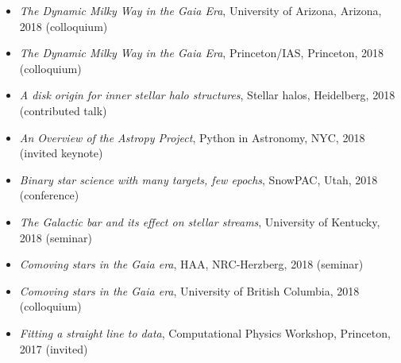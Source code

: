 \documentclass[12pt, letterpaper]{apw-cv}
\begin{document}
\begin{itemize}
    \item \emph{The Dynamic Milky Way in the Gaia Era}, University of Arizona, Arizona, 2018 (colloquium)
    \item \emph{The Dynamic Milky Way in the Gaia Era}, Princeton/IAS, Princeton, 2018 (colloquium)
    \item \emph{A disk origin for inner stellar halo structures}, Stellar halos, Heidelberg, 2018 (contributed talk)
    \item \emph{An Overview of the Astropy Project}, Python in Astronomy, NYC, 2018 (invited keynote)
    \item \emph{Binary star science with many targets, few epochs}, SnowPAC, Utah, 2018 (conference)
    \item \emph{The Galactic bar and its effect on stellar streams}, University of Kentucky, 2018 (seminar)
    \item \emph{Comoving stars in the Gaia era}, HAA, NRC-Herzberg, 2018 (seminar)
    \item \emph{Comoving stars in the Gaia era}, University of British Columbia, 2018 (colloquium)
    \item \emph{Fitting a straight line to data}, Computational Physics Workshop, Princeton, 2017 (invited)

\end{itemize}
\end{document}
